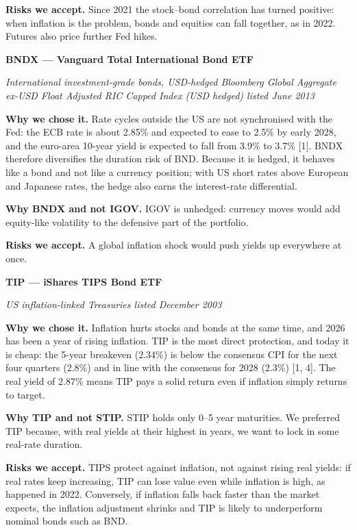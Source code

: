\documentclass[
]{article}
\begin{document}
\textbf{Risks we accept.} Since 2021 the stock--bond correlation has
turned positive: when inflation is the problem, bonds and equities can
fall together, as in 2022. Futures also price further Fed hikes.

\textbf{BNDX --- Vanguard Total International Bond ETF}

\emph{International investment-grade bonds, USD-hedged \textperiodcentered{} Bloomberg
Global Aggregate ex-USD Float Adjusted RIC Capped Index (USD hedged) \textperiodcentered{}
listed June 2013}

\textbf{Why we chose it.} Rate cycles outside the US are not
synchronised with the Fed: the ECB rate is about 2.85\% and expected to
ease to 2.5\% by early 2028, and the euro-area 10-year yield is expected
to fall from 3.9\% to 3.7\% {[}1{]}. BNDX therefore diversifies the
duration risk of BND. Because it is hedged, it behaves like a bond and
not like a currency position; with US short rates above European and
Japanese rates, the hedge also earns the interest-rate differential.

\textbf{Why BNDX and not IGOV.} IGOV is unhedged: currency moves would
add equity-like volatility to the defensive part of the portfolio.

\textbf{Risks we accept.} A global inflation shock would push yields up
everywhere at once.

\textbf{TIP --- iShares TIPS Bond ETF}

\emph{US inflation-linked Treasuries \textperiodcentered{} listed December 2003}

\textbf{Why we chose it.} Inflation hurts stocks and bonds at the same
time, and 2026 has been a year of rising inflation. TIP is the most
direct protection, and today it is cheap: the 5-year breakeven (2.34\%)
is below the consensus CPI for the next four quarters (2.8\%) and in
line with the consensus for 2028 (2.3\%) {[}1, 4{]}. The real yield of
2.87\% means TIP pays a solid return even if inflation simply returns to
target.

\textbf{Why TIP and not STIP.} STIP holds only 0--5 year maturities. We
preferred TIP because, with real yields at their highest in years, we
want to lock in some real-rate duration.

\textbf{Risks we accept.} TIPS protect against inflation, not against
rising real yields: if real rates keep increasing, TIP can lose value
even while inflation is high, as happened in 2022. Conversely, if
inflation falls back faster than the market expects, the inflation
adjustment shrinks and TIP is likely to underperform nominal bonds such
as BND.
\end{document}
